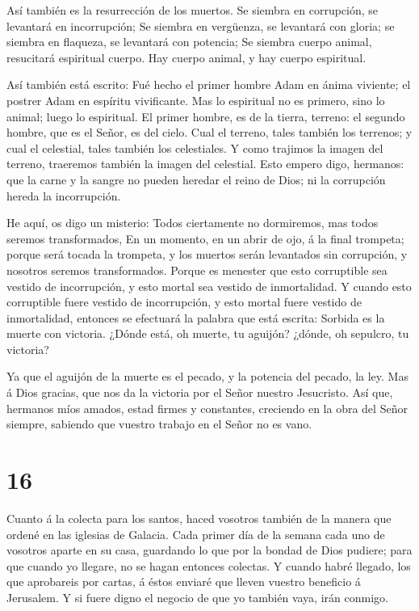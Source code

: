  Así también es la resurrección de los muertos. Se siembra
en corrupción, se levantará en incorrupción;  Se siembra en
vergüenza, se levantará con gloria; se siembra en flaqueza, se levantará
con potencia;  Se siembra cuerpo animal, resucitará
espiritual cuerpo. Hay cuerpo animal, y hay cuerpo espiritual.

 Así también está escrito: Fué hecho el primer hombre Adam
en ánima viviente; el postrer Adam en espíritu vivificante.
 Mas lo espiritual no es primero, sino lo animal; luego lo
espiritual.  El primer hombre, es de la tierra, terreno: el
segundo hombre, que es el Señor, es del cielo.  Cual el
terreno, tales también los terrenos; y cual el celestial, tales también
los celestiales.  Y como trajimos la imagen del terreno,
traeremos también la imagen del celestial.  Esto empero
digo, hermanos: que la carne y la sangre no pueden heredar el reino de
Dios; ni la corrupción hereda la incorrupción.

 He aquí, os digo un misterio: Todos ciertamente no
dormiremos, mas todos seremos transformados,  En un
momento, en un abrir de ojo, á la final trompeta; porque será tocada la
trompeta, y los muertos serán levantados sin corrupción, y nosotros
seremos transformados.  Porque es menester que esto
corruptible sea vestido de incorrupción, y esto mortal sea vestido de
inmortalidad.  Y cuando esto corruptible fuere vestido de
incorrupción, y esto mortal fuere vestido de inmortalidad, entonces se
efectuará la palabra que está escrita: Sorbida es la muerte con
victoria.  ¿Dónde está, oh muerte, tu aguijón? ¿dónde, oh
sepulcro, tu victoria?

 Ya que el aguijón de la muerte es el pecado, y la potencia
del pecado, la ley.  Mas á Dios gracias, que nos da la
victoria por el Señor nuestro Jesucristo.  Así que,
hermanos míos amados, estad firmes y constantes, creciendo en la obra
del Señor siempre, sabiendo que vuestro trabajo en el Señor no es vano.

\hypertarget{section-15}{%
\section{16}\label{section-15}}

 Cuanto á la colecta para los santos, haced vosotros también
de la manera que ordené en las iglesias de Galacia.  Cada
primer día de la semana cada uno de vosotros aparte en su casa,
guardando lo que por la bondad de Dios pudiere; para que cuando yo
llegare, no se hagan entonces colectas.  Y cuando habré
llegado, los que aprobareis por cartas, á éstos enviaré que lleven
vuestro beneficio á Jerusalem.  Y si fuere digno el negocio
de que yo también vaya, irán conmigo.

